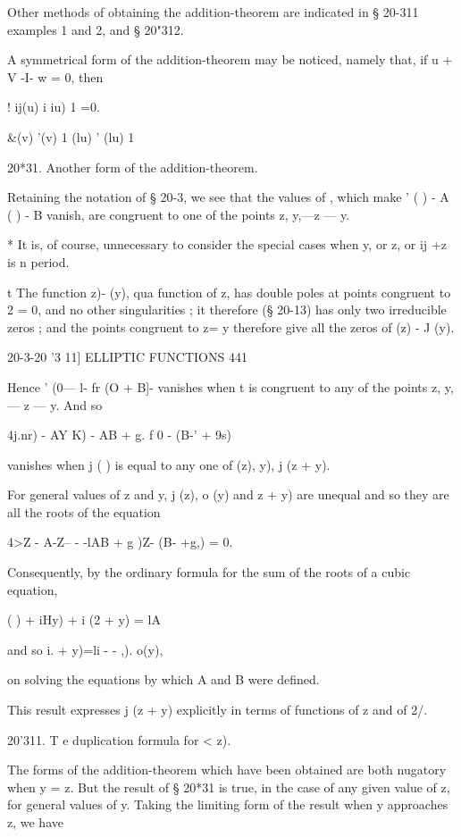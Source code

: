 {Other methods of obtaining the addition-theorem are indicated in §
20-311 examples 1 and 2, and § 20"312.

A symmetrical form of the addition-theorem may be noticed, namely
that, if u + V -I- w = 0, then

! ij(u) i iu) 1 =0.

\&(v) '(v) 1 (lu) ' (lu) 1

20*31. Another form of the addition-theorem.

Retaining the notation of § 20-3, we see that the values of , which
make ' ( ) - A ( ) - B vanish, are congruent to one of the points z,
y,—z — y.

* It is, of course, unnecessary to consider the special cases when y,
or z, or ij +z is n period.

t The function z)- (y), qua function of z, has double poles at points
congruent to 2 = 0, and no other singularities ; it therefore (§
20-13) has only two irreducible zeros ; and the points congruent to z=
y therefore give all the zeros of (z) - J (y).

20-3-20 '3 11] ELLIPTIC FUNCTIONS 441

Hence ' (0— l- fr (O + B]- vanishes when t is congruent to any of the
points z, y, — z — y. And so

4j.nr) - AY K) - AB + g. f 0 - (B-' + 9s)

vanishes when j ( ) is equal to any one of (z), y), j (z + y).

For general values of z and y, j (z), o (y) and z + y) are unequal and
so they are all the roots of the equation

4>Z - A-Z-- - -lAB + g )Z- (B- +g,) = 0.

Consequently, by the ordinary formula for the sum of the roots of a
cubic equation,

 ( ) + iHy) + i (2 + y) = lA%

and so i. + y)=li - - ,). o(y),

on solving the equations by which A and B were defined.

This result expresses j (z + y) explicitly in terms of functions of z
and of 2/.

20'311. T e duplication formula for < z).

The forms of the addition-theorem which have been obtained are both
nugatory when y = z. But the result of § 20*31 is true, in the case of
any given value of z, for general values of y. Taking the limiting
form of the result when y approaches z, we have

}
